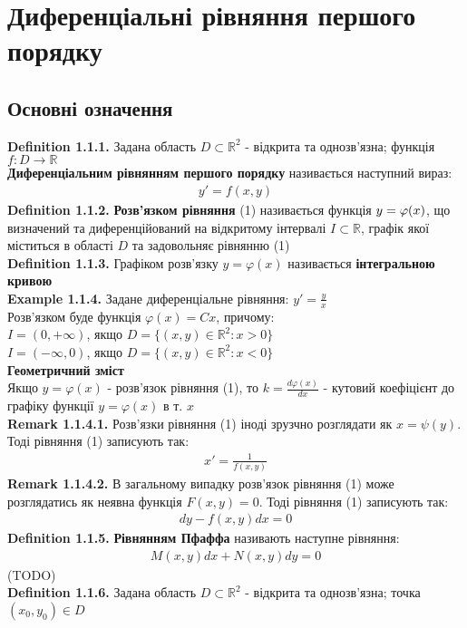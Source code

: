 \documentclass[a4paper, 14pt]{extarticle}
\def\defin#1{\textbf{Definition {#1}}}
\def\ex#1{\textbf{Example {#1}}}
\def\rm#1{\textbf{Remark {#1}}}
\def\bigline{\vspace{5mm}\\}
\begin{document}
\tableofcontents
\newpage
    	
	\section{Диференціальні рівняння першого порядку}
	\subsection{Основні означення}
	\defin{1.1.1.} Задана область $D \subset \mathbb{R}^2$ - відкрита та однозв'язна; функція $f: D \rightarrow \mathbb{R}$\\
	\textbf{Диференціальним рівнянням першого порядку} називається наступний вираз:
	\begin{align}
	y' = f(x,y)
	\end{align}
	\defin{1.1.2.} \textbf{Розв'язком рівняння} (1) називається функція $\\ y= \varphi(x)$, що визначений та диференційований на відкритому інтервалі $I \subset \mathbb{R}$, графік якої міститься в області $D$ та задовольняє рівнянню (1)
	\bigline
	\defin{1.1.3.} Графіком розв'язку $y = \varphi(x)$ називається \textbf{інтегральною кривою}
	\bigline
	\ex{1.1.4.} Задане диференціальне рівняння: $\displaystyle y' = \frac{y}{x}$\\
	Розв'язком буде функція $\varphi(x)=Cx$, причому:\\
	$I=(0, +\infty)$, якщо $D=\{(x,y) \in \mathbb{R}^2: x>0\}$\\
	$I=(-\infty, 0)$, якщо $D=\{(x,y) \in \mathbb{R}^2: x<0\}$
	\bigline
	\textbf{Геометричний зміст}\\
	Якщо $y=\varphi(x)$ - розв'язок рівняння (1), то $\displaystyle k = \frac{d\varphi(x)}{dx}$ - кутовий коефіцієнт до графіку функції $y=\varphi(x)$ в т. $x$
	\bigline
	\rm{1.1.4.1.} Розв'язки рівняння (1) іноді зрузчно розглядати як $x=\psi(y)$. Тоді рівняння (1) записують так:
	\begin{align*}
	x'=\frac{1}{f(x,y)}
	\end{align*}
	\rm{1.1.4.2.} В загальному випадку розв'язок рівняння (1) може розглядатись як неявна функція $F(x,y)=0$. Тоді рівняння (1) записують так:
	\begin{align*}
	dy - f(x,y)dx=0
	\end{align*}
	\defin{1.1.5.} \textbf{Рівнянням Пфаффа} називають наступне рівняння:
	\begin{align}
	M(x,y)dx + N(x,y)dy=0
	\end{align}
	(TODO)
	\bigline
	\defin{1.1.6.} Задана область $D \subset \mathbb{R}^2$ - відкрита та однозв'язна; точка $(x_0, y_0) \in D$\\
\end{document}
